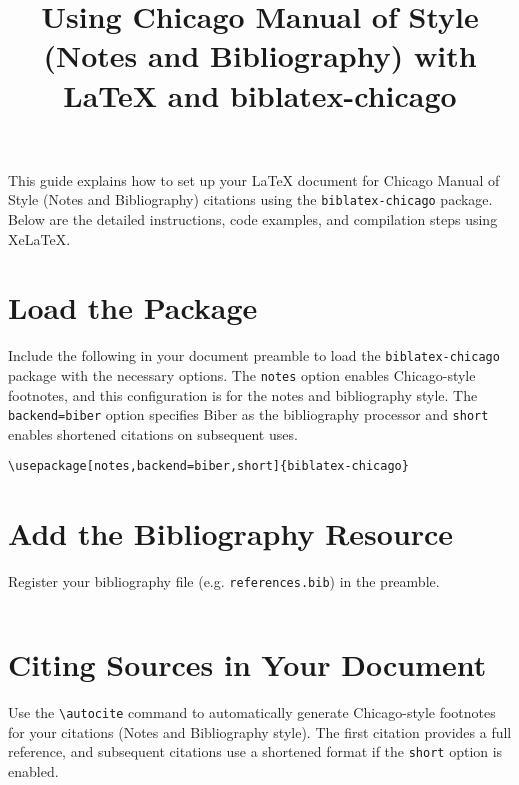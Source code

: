 \documentclass{article}
\title{Using Chicago Manual of Style (Notes and Bibliography) with LaTeX and biblatex-chicago}
\author{}
\date{}
\begin{document}
\maketitle

This guide explains how to set up your LaTeX document for Chicago Manual of Style (Notes and Bibliography) citations using the \texttt{biblatex-chicago} package. Below are the detailed instructions, code examples, and compilation steps using XeLaTeX.

\vspace{1em}

\section{Load the Package}

Include the following in your document preamble to load the \texttt{biblatex-chicago} package with the necessary options. The \texttt{notes} option enables Chicago-style footnotes, and this configuration is for the notes and bibliography style. The \texttt{backend=biber} option specifies Biber as the bibliography processor and \texttt{short} enables shortened citations on subsequent uses.

\begin{lstlisting}
\usepackage[notes,backend=biber,short]{biblatex-chicago}
\end{lstlisting}

\vspace{1em}

\section{Add the Bibliography Resource}

Register your bibliography file (e.g. \texttt{references.bib}) in the preamble.

\begin{lstlisting}

\end{lstlisting}

\vspace{1em}

\section{Citing Sources in Your Document}

Use the \verb|\autocite| command to automatically generate Chicago-style footnotes for your citations (Notes and Bibliography style). The first citation provides a full reference, and subsequent citations use a shortened format if the \texttt{short} option is enabled.
\end{document}

